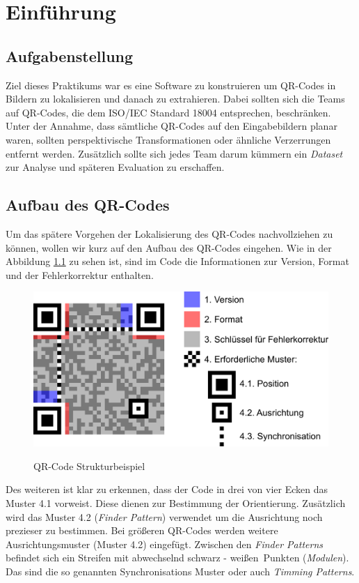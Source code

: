 \chapter{Einführung}
\section{Aufgabenstellung}
Ziel dieses Praktikums war es eine Software zu konstruieren um QR-Codes in Bildern zu lokalisieren und danach zu extrahieren.
Dabei sollten sich die Teams auf QR-Codes, die dem ISO/IEC Standard 18004 entsprechen, beschränken.
Unter der Annahme, dass sämtliche QR-Codes auf den Eingabebildern planar waren, sollten perspektivische Transformationen oder ähnliche Verzerrungen entfernt werden.
Zusätzlich sollte sich jedes Team darum kümmern ein \emph{Dataset} zur Analyse und späteren Evaluation zu erschaffen.
 
\section{Aufbau des QR-Codes}
Um das spätere Vorgehen der Lokalisierung des QR-Codes nachvollziehen zu können, wollen wir kurz auf den Aufbau des QR-Codes eingehen.
Wie in der Abbildung \ref{fig:struktur-qrcode} zu sehen ist, sind im Code die Informationen zur Version, Format und der Fehlerkorrektur enthalten. 

\begin{figure}[h]
\centering
\includegraphics[scale=0.3]{images/QR_Code_Struktur_Beispiel.png}
\label{fig:struktur-qrcode}\caption{QR-Code Strukturbeispiel}
\end{figure}

Des weiteren ist klar zu erkennen, dass der Code in drei von vier Ecken das Muster 4.1 vorweist. Diese dienen zur Bestimmung der Orientierung. Zusätzlich wird das Muster 4.2 (\emph{Finder Pattern}) verwendet um die Ausrichtung noch prezieser zu bestimmen. Bei größeren QR-Codes werden weitere Ausrichtungsmuster (Muster 4.2) eingefügt. Zwischen den \emph{Finder Patterns} befindet sich ein Streifen mit abwechselnd \glqq schwarz - weißen\grqq\  Punkten (\emph{Modulen}). Das sind die so genannten Synchronisations Muster oder auch \emph{Timming Patterns}.

